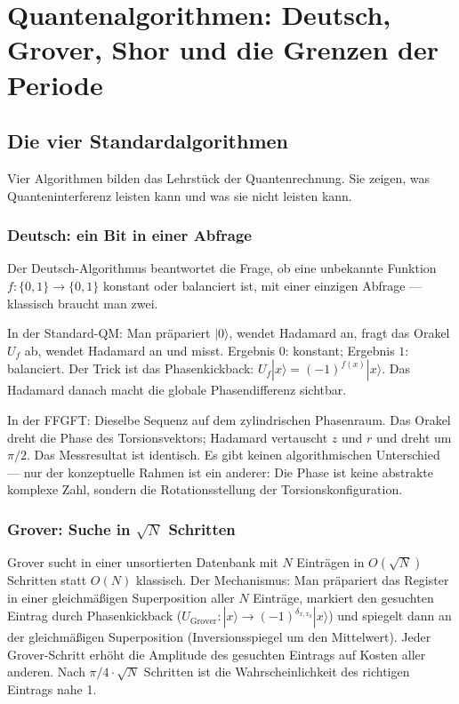 \chapter{Quantenalgorithmen: Deutsch, Grover, Shor und die Grenzen der Periode}
\label{ch:algorithmen}

\section{Die vier Standardalgorithmen}

Vier Algorithmen bilden das Lehrstück der Quantenrechnung. Sie zeigen,
was Quanteninterferenz leisten kann und was sie nicht leisten kann.

\subsection*{Deutsch: ein Bit in einer Abfrage}

Der Deutsch-Algorithmus beantwortet die Frage, ob eine unbekannte
Funktion $f:\{0,1\}\to\{0,1\}$ konstant oder balanciert ist, mit einer
einzigen Abfrage --- klassisch braucht man zwei.

In der Standard-QM: Man präpariert $|0\rangle$, wendet Hadamard an,
fragt das Orakel $U_f$ ab, wendet Hadamard an und misst. Ergebnis $0$:
konstant; Ergebnis $1$: balanciert. Der Trick ist das Phasenkickback:
$U_f|x\rangle = (-1)^{f(x)}|x\rangle$. Das Hadamard danach macht die
globale Phasendifferenz sichtbar.

In der FFGFT: Dieselbe Sequenz auf dem zylindrischen Phasenraum. Das
Orakel dreht die Phase des Torsionsvektors; Hadamard vertauscht $z$ und
$r$ und dreht um $\pi/2$. Das Messresultat ist identisch. Es gibt keinen
algorithmischen Unterschied --- nur der konzeptuelle Rahmen ist ein
anderer: Die Phase ist keine abstrakte komplexe Zahl, sondern die
Rotationsstellung der Torsionskonfiguration.

\subsection*{Grover: Suche in $\sqrt N$ Schritten}

Grover sucht in einer unsortierten Datenbank mit $N$ Einträgen in $O(\sqrt N)$
Schritten statt $O(N)$ klassisch. Der Mechanismus: Man präpariert das
Register in einer gleichmäßigen Superposition aller $N$ Einträge,
markiert den gesuchten Eintrag durch Phasenkickback
($U_\mathrm{Grover}:|x\rangle\to(-1)^{\delta_{x,x_0}}|x\rangle$) und
spiegelt dann an der gleichmäßigen Superposition (Inversionsspiegel um
den Mittelwert). Jeder Grover-Schritt erhöht die Amplitude des gesuchten
Eintrags auf Kosten aller anderen. Nach $\pi/4\cdot\sqrt N$ Schritten
ist die Wahrscheinlichkeit des richtigen Eintrags nahe 1.

